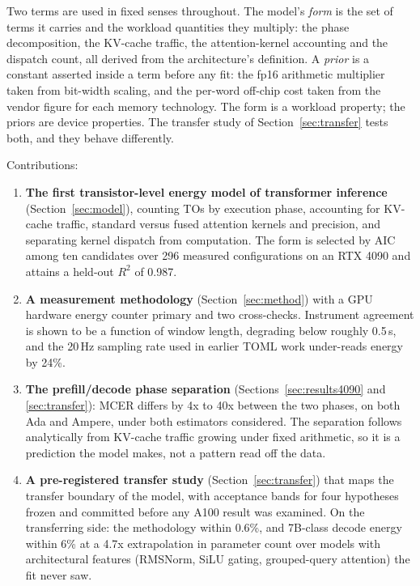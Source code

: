 \documentclass[conference]{IEEEtran}
\begin{document}
Two terms are used in fixed senses throughout. The model's \emph{form} is
the set of terms it carries and the workload quantities they multiply: the
phase decomposition, the KV-cache traffic, the attention-kernel accounting
and the dispatch count, all derived from the architecture's definition. A
\emph{prior} is a constant asserted inside a term before any fit: the fp16
arithmetic multiplier taken from bit-width scaling, and the per-word
off-chip cost taken from the vendor figure for each memory technology. The
form is a workload property; the priors are device properties. The transfer
study of Section~\ref{sec:transfer} tests both, and they behave
differently.

Contributions:

\begin{enumerate}
\item \textbf{The first transistor-level energy model of transformer
inference} (Section~\ref{sec:model}), counting TOs by execution phase,
accounting for KV-cache traffic, standard versus fused attention kernels and
precision, and separating kernel dispatch from computation. The form is
selected by AIC among ten candidates over 296 measured configurations on an
RTX 4090 and attains a held-out $R^2$ of 0.987.

\item \textbf{A measurement methodology} (Section~\ref{sec:method}) with a
GPU hardware energy counter primary and two cross-checks. Instrument
agreement is shown to be a function of window length, degrading below
roughly 0.5\,s, and the 20\,Hz sampling rate used in earlier TOML work
under-reads energy by 24\%.

\item \textbf{The prefill/decode phase separation}
(Sections~\ref{sec:results4090} and \ref{sec:transfer}): MCER differs by 4x
to 40x between the two phases, on both Ada and Ampere, under both estimators
considered. The separation follows analytically from KV-cache traffic
growing under fixed arithmetic, so it is a prediction the model makes, not a
pattern read off the data.

\item \textbf{A pre-registered transfer study} (Section~\ref{sec:transfer})
that maps the transfer boundary of the model, with acceptance bands for four
hypotheses frozen and committed before any A100 result was examined. On the
transferring side: the methodology within 0.6\%, and 7B-class decode energy
within 6\% at a 4.7x extrapolation in parameter count over models with
architectural features (RMSNorm, SiLU gating, grouped-query attention) the
fit never saw.


\end{enumerate}
\end{document}

